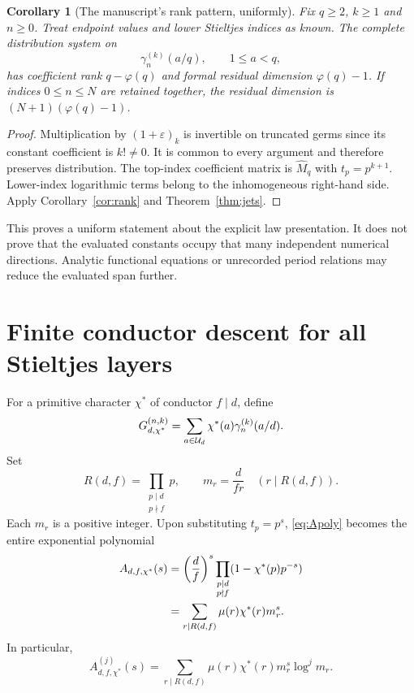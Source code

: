 \documentclass[11pt]{article}
\numberwithin{equation}{section}
\newtheorem{corollary}[theorem]{Corollary}
\theoremstyle{definition}\newtheorem{definition}[theorem]{Definition}
\theoremstyle{remark}\newtheorem{remark}[theorem]{Remark}
\newcommand{\eps}{\varepsilon}
\newcommand{\ch}{\chi^*}
\begin{document}
\begin{corollary}[The manuscript's rank pattern, uniformly]\label{cor:stielrank}
Fix $q\ge2$, $k\ge1$ and $n\ge0$. Treat endpoint values and lower
Stieltjes indices as known. The complete distribution system on
\[
\gamma_n^{(k)}(a/q),\qquad 1\le a<q,
\]
has coefficient rank $q-\varphi(q)$ and formal residual dimension
$\varphi(q)-1$. If indices $0\le n\le N$ are retained together, the
residual dimension is $(N+1)(\varphi(q)-1)$.
\end{corollary}
\begin{proof}
Multiplication by $(1+\eps)_k$ is invertible on truncated germs since its
constant coefficient is $k!\ne0$. It is common to every argument and
therefore preserves distribution. The top-index coefficient matrix is
$\widehat M_q$ with $t_p=p^{k+1}$. Lower-index logarithmic terms belong to
the inhomogeneous right-hand side. Apply Corollary~\ref{cor:rank} and
Theorem~\ref{thm:jets}.
\end{proof}

This proves a uniform statement about the explicit law presentation. It
does not prove that the evaluated constants occupy that many independent
numerical directions. Analytic functional equations or unrecorded period
relations may reduce the evaluated span further.

\section{Finite conductor descent for all Stieltjes layers}

For a primitive character $\ch$ of conductor $f\mid d$, define
\begin{equation}
G_{d,\ch}^{(n,k)}=
\sum_{a\in\U_d}\ch(a)\gamma_n^{(k)}(a/d).
\end{equation}
Set
\begin{equation}\label{eq:Rdf}
R(d,f)=\prod_{\substack{p\mid d\\p\nmid f}}p,
\qquad m_r=\frac{d}{fr}\quad(r\mid R(d,f)).
\end{equation}
Each $m_r$ is a positive integer. Upon substituting $t_p=p^s$,
\eqref{eq:Apoly} becomes the entire exponential polynomial
\begin{align}\label{eq:Aanalytic}
A_{d,f,\ch}(s)
&=\left(\frac df\right)^s
\prod_{\substack{p\mid d\\p\nmid f}}(1-\ch(p)p^{-s})\notag\\
&=\sum_{r\mid R(d,f)}\mu(r)\ch(r)m_r^s.
\end{align}
In particular,
\begin{equation}\label{eq:Aderivative}
A_{d,f,\ch}^{(j)}(s)
=\sum_{r\mid R(d,f)}\mu(r)\ch(r)m_r^s\log^j m_r.
\end{equation}
\end{document}
